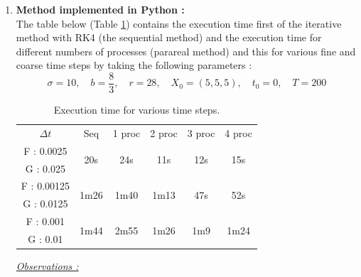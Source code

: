 \begin{enumerate}[label=\textbullet]
	\item \textbf{Method implemented in Python :} \\
	The table below (Table \ref{time}) contains the execution time first of the iterative method with RK4 (the sequential method) and the execution time for different numbers of processes (parareal method) and this for various fine and coarse time steps by taking the following parameters :
	$$\sigma=10, \quad b=\frac{8}{3}, \quad r=28, \quad X_0=(5,5,5), \quad t_0=0, \quad T=200$$
	\renewcommand{\arraystretch}{1.2}
	\begin{table}[H]
		\centering
		\begin{tabular}{| c || c | c | c | c | c |}
			\hline
			\multirow{2}{1.5 cm}{$\Delta t$} & \multirow{2}{1.5 cm}{Seq} & \multirow{2}{1.5 cm}{1 proc} & \multirow{2}{1.5 cm}{2 proc} & \multirow{2}{1.5 cm}{3 proc} &\multirow{2}{1.5 cm}{4 proc} \\
			& & & & & \\
			\hline 
			F : 0.0025 & \multirow{2}{1.5 cm}{20s} & \multirow{2}{1.5 cm}{24s} & \multirow{2}{1.5 cm}{11s} & \multirow{2}{1.5 cm}{12s} & \multirow{2}{1.5 cm}{15s} \\
			G : 0.025 & & & & & \\
			\hline 
			F : 0.00125 & \multirow{2}{1.5 cm}{1m26} & \multirow{2}{1.5 cm}{1m40} & \multirow{2}{1.5 cm}{1m13} & \multirow{2}{1.5 cm}{47s} & \multirow{2}{1.5 cm}{52s} \\
			G : 0.0125 & & & & & \\
			\hline 
			F : 0.001 & \multirow{2}{1.5 cm}{1m44} & \multirow{2}{1.5 cm}{2m55} & \multirow{2}{1.5 cm}{1m26} & \multirow{2}{1.5 cm}{1m9} & \multirow{2}{1.5 cm}{1m24} \\
			G : 0.01 & & & & & \\	 
			\hline
		\end{tabular}
		\caption{Execution time for various time steps.}
		\label{time}
	\end{table}
	\newpage
	\noindent \underline{\textit{Observations :}} 
	

\end{enumerate}
